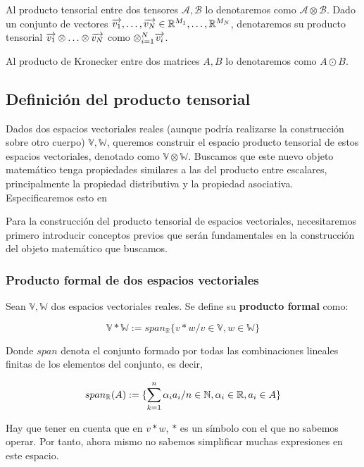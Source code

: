 Al producto tensorial entre dos tensores $\mathcal{A}, \mathcal{B}$ lo denotaremos como $\mathcal{A} \otimes \mathcal{B}$. Dado un conjunto de vectores $\overrightarrow{v_1}, \ldots, \overrightarrow{v_N} \in \mathbb{R}^{M_1}, \ldots, \mathbb{R}^{M_N}$, denotaremos su producto tensorial $\overrightarrow{v_1} \otimes \ldots \otimes \overrightarrow{v_N}$ como $\otimes_{i = 1}^N \overrightarrow{v_i}$.

Al producto de Kronecker entre dos matrices $A, B$ lo denotaremos como $A \odot B$.

\subsection{Definición del producto tensorial} \label{sec:deftensor}

Dados dos espacios vectoriales reales (aunque podría realizarse la construcción sobre otro cuerpo) $\mathbb{V}, \mathbb{W}$, queremos construir el espacio producto tensorial de estos espacios vectoriales, denotado como $\mathbb{V} \otimes \mathbb{W}$. Buscamos que este nuevo objeto matemático tenga propiedades similares a las del producto entre escalares, principalmente la propiedad distributiva y la propiedad asociativa. Especificaremos esto en 

Para la construcción del producto tensorial de espacios vectoriales, necesitaremos primero introducir conceptos previos que serán fundamentales en la construcción del objeto matemático que buscamos.

\subsubsection{Producto formal de dos espacios vectoriales}

\begin{definicion}
    Sean $\mathbb{V}, \mathbb{W}$ dos espacios vectoriales reales. Se define su \textbf{producto formal} como:

    \begin{equation}
        \mathbb{V} \ast \mathbb{W} := span_{\mathbb{R}} \{v \ast w / v \in \mathbb{V}, w \in \mathbb{W} \}
    \end{equation}

    Donde $span$ denota el conjunto formado por todas las combinaciones lineales finitas de los elementos del conjunto, es decir,

    \begin{equation}
        span_{\mathbb{R}}(A) := \{ \sum_{k = 1}^n \alpha_i a_i / n \in \mathbb{N}, \alpha_i \in \mathbb{R}, a_i \in A \}
    \end{equation}

    Hay que tener en cuenta que en $v \ast w$, $\ast$ es un símbolo con el que no sabemos operar. Por tanto, ahora mismo no sabemos simplificar muchas expresiones en este espacio.
\end{definicion}


